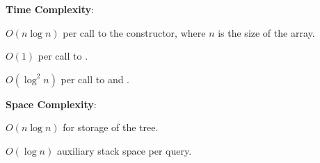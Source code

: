 \textbf{Time Complexity}:
\begin{compactitem}
  \item $O(n \log n)$ per call to the constructor, where $n$ is the size of the array.
  \item $O(1)$ per call to .
  \item $O(\log^{2} n)$ per call to  and .
\end{compactitem}

\textbf{Space Complexity}:
\begin{compactitem}
  \item $O(n \log n)$ for storage of the tree.
  \item $O(\log n)$ auxiliary stack space per query.
\end{compactitem}

